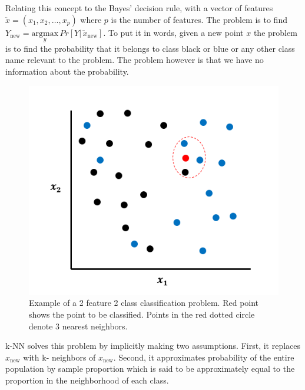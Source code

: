 \documentclass{article}
\begin{document}
Relating this concept to the Bayes' decision rule, with a vector of features $\utilde{x} = (x_1, x_2, \dots, x_p)$ where $p$ is the number of features. The problem is to find $Y_{\mathrm{new}} = \underset{y}{\mathrm{argmax}}\, Pr[Y|\, \utilde{x}_{\mathrm{new}}]$. To put it in words, given a new point $x$ the problem is to find the probability that it belongs to class black or blue or any other class name relevant to the problem. The problem however is that we have no information about the probability.

\begin{figure}
    \begin{center}
        \includegraphics[scale=0.5]{classificationkNN.PNG}
        \caption{Example of a 2 feature 2 class classification problem. Red point shows the point to be classified. Points in the red dotted circle denote 3 nearest neighbors.}
    \end{center}
    \label{Fig.1}
\end{figure}

k-NN solves this problem by implicitly making two assumptions. First, it replaces $x_{\mathrm{new}}$ with k- neighbors of $x_{\mathrm{new}}$. Second, it approximates probability of the entire population by sample proportion which is said to be approximately equal to the proportion in the neighborhood of each class.
\end{document}
